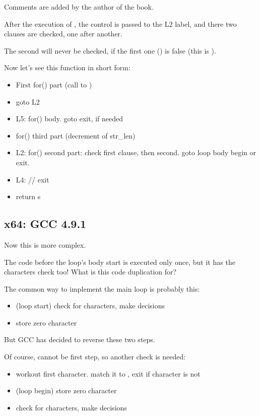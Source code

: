 Comments are added by the author of the book.

After the execution of \strlen{}, the control is passed to the L2 label, 
and there two clauses are checked, one after another.

The second will never be checked, if the first one () is false 
(this is ).

Now let's see this function in short form:

\begin{itemize}
\item First for() part (call to \strlen{})
\item goto L2
\item L5: for() body. goto exit, if needed
\item for() third part (decrement of str\_len)
\item L2: 
for() second part: check first clause, then second. goto loop body begin or exit.
\item L4: // exit
\item return s
\end{itemize}

\subsection{x64: \Optimizing GCC 4.9.1}
\label{string_trim_GCC_x64_O3}



Now this is more complex.

The code before the loop's body start is executed only once, but it has the \CRLF{} 
characters check too!
What is this code duplication for?

The common way to implement the main loop is probably this:

\begin{itemize}
\item (loop start) check for 
\CRLF{} characters, make decisions
\item store zero character
\end{itemize}

But GCC has decided to reverse these two steps. 

Of course,  cannot be first step, so another check is needed:

\begin{itemize}
\item workout first character. match it to \CRLF{}, exit if character is not \CRLF{}

\item (loop begin) store zero character

\item check for \CRLF{} characters, make decisions
\end{itemize}


